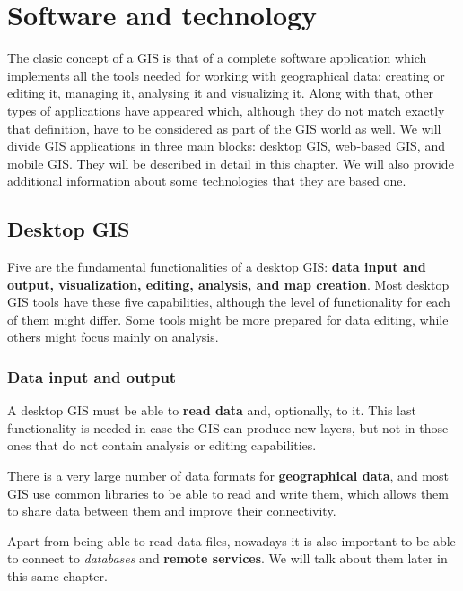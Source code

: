 
\chapter{Software and technology}

\pagestyle{fancy}

The clasic concept of a GIS is that of a complete software application which implements all the tools needed for working with geographical data: creating or editing it, managing it, analysing it and visualizing it. Along with that, other types of applications have appeared which, although they do not match exactly that definition, have to be considered as part of the GIS world as well.
We will divide GIS applications in three main blocks: desktop GIS, web-based GIS, and mobile GIS. They will be described in detail in this chapter. We will also provide additional information about some technologies that they are based one.


\section{Desktop GIS}

Five are the fundamental functionalities of a desktop GIS: \textbf{data input and output, visualization, editing, analysis, and map creation}. Most desktop GIS tools have these five capabilities, although the level of functionality for each of them might differ. Some tools might be more prepared for data editing, while others might focus mainly on analysis.

\subsection{Data input and output}

A desktop GIS must be able to \textbf{read data} and, optionally, to  it. This last functionality is needed in case the GIS can produce new layers, but not in those ones that do not contain analysis or editing capabilities.

There is a very large number of data formats for \textbf{geographical data}, and most GIS use common libraries to be able to read and write them, which allows them to share data between them and improve their connectivity.

Apart from being able to read data files, nowadays it is also important to be able to connect to \emph{databases} and \textbf{remote services}. We will talk about them later in this same chapter.

